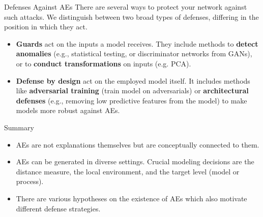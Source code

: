 \documentclass[11pt,compress,t,notes=noshow, aspectratio=169, xcolor=table]{beamer}
\begin{document}
\begin{vbframe}{Defenses Against AEs}
There are several ways to protect your network against such attacks. We distinguish between two broad types of defenses, differing in the position in which they act.
\begin{itemize}
    \item \textbf{Guards} act on the inputs a model receives. They include methods to \textbf{detect anomalies} (e.g., statistical testing, or discriminator networks from GANs), or to \textbf{conduct transformations} on inputs (e.g. PCA).
    \item \textbf{Defense by design} act on the employed model itself. It includes methods like \textbf{adversarial training} (train model on adversarials) or \textbf{architectural defenses} (e.g., removing low predictive features from the model) %
    to make models more robust against AEs.
\end{itemize}
\end{vbframe}


\begin{vbframe}{Summary}
\begin{itemize}
    \item AEs are not explanations themselves but are conceptually connected to them.
    \item AEs can be generated in diverse settings. Crucial modeling decisions are the distance measure, the local environment, and the target level (model or process).
    \item There are various hypotheses on the existence of AEs which also motivate different defense strategies.
\end{itemize}
\end{vbframe}
\end{document}
